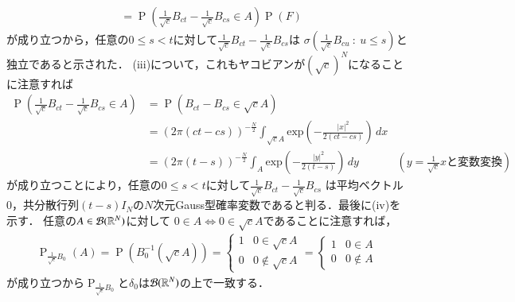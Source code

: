 \begin{prf}
\begin{description}
\begin{align}
			&= \operatorname{P}\left(\tfrac{1}{\sqrt{c}}B_{ct} - \tfrac{1}{\sqrt{c}}B_{cs} \in A \right)  \operatorname{P}(F)
		\end{align}
		が成り立つから，任意の$0 \leq s < t$に対して$\tfrac{1}{\sqrt{c}}B_{ct} - \tfrac{1}{\sqrt{c}}B_{cs}$は
		$\sigma\left(\tfrac{1}{\sqrt{c}}B_{cu}\ :\ u \leq s\right)$と独立であると示された．
		(iii)について，これもヤコビアンが$\left(\sqrt{c}\right)^{N}$になることに注意すれば
		\begin{align}
			\operatorname{P}\left( \tfrac{1}{\sqrt{c}}B_{ct} - \tfrac{1}{\sqrt{c}}B_{cs} \in A \right)
			&= \operatorname{P}\left( B_{ct} - B_{cs} \in \sqrt{c}A \right) \\
			&= (2\pi(ct-cs))^{-\frac{N}{2}} \int_{\sqrt{c}A} \mathrm{exp}\left( -\frac{|x|^2}{2(ct-cs)} \right)\, dx \\
			&= (2\pi(t-s))^{-\frac{N}{2}} \int_{A} \mathrm{exp}\left( -\frac{|y|^2}{2(t-s)} \right)\, dy 
				& \left( y = \tfrac{1}{\sqrt{c}}x\mbox{と変数変換}\right)
		\end{align}
		が成り立つことにより，任意の$0 \leq s < t$に対して$\tfrac{1}{\sqrt{c}}B_{ct} - \tfrac{1}{\sqrt{c}}B_{cs}$
		は平均ベクトル0，共分散行列$(t-s)I_N$の$N$次元Gauss型確率変数であると判る．最後に(iv)を示す．
		任意の$A \in \mathcal{B}(\mathbb{R}^N)$に対して
		$0 \in A \Leftrightarrow 0 \in \sqrt{c}A$であることに注意すれば，
		\begin{align}
			\operatorname{P}_{\tfrac{1}{\sqrt{c}}B_0}(A) 
			= \operatorname{P}\left(B_0^{-1}\left(\sqrt{c}A\right)\right)
			= \begin{cases}
				1 & 0 \in \sqrt{c}A \\
				0 & 0 \notin \sqrt{c}A
			\end{cases}
			= \begin{cases}
				1 & 0 \in A \\
				0 & 0 \notin A
			\end{cases}
		\end{align}
		が成り立つから$\operatorname{P}_{\tfrac{1}{\sqrt{c}}B_0}$と$\delta_0$は$\mathcal{B}(\mathbb{R}^N)$の上で一致する．
		

\end{description}
\end{prf}
